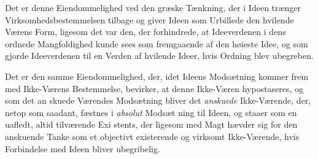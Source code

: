 \documentclass[12pt,a4paper]{book}
\begin{document}
Det er denne Eiendommelighed ved den græske Tænkning,
der i Ideen trænger Virksomhedsbestemmelsen tilbage og giver
Ideen som Urbillede den hvilende Værens Form, ligesom det
var den, der forhindrede, at Ideeverdenen i dens ordnede
Mangfoldighed kunde sees som fremgaaende af den høieste Idee,
og som gjorde Ideeverdenen til en Verden af hvilende Ideer, hvis
Ordning blev ubegreben.

Det er den samme Eiendommelighed, der, idet Ideens
Modsætning kommer frem med Ikke-Værens Bestemmelse,
bevirker, at denne Ikke-Væren hypostaseres, og som det an\-%
skuede Værendes Modsætning bliver det \emph{anskuede} Ikke-Værende,
der, netop som saadant, fæstnes i \emph{absolut} Modsæt\-%
ning til Ideen, og staaer som en uafledt, altid tilværende Exi\-%
stents, der ligesom med Magt hævder sig for den anskuende
Tanke som et objectivt existerende og virksomt Ikke-Værende,
hvis Forbindelse med Ideen bliver ubegribelig.
\end{document}
